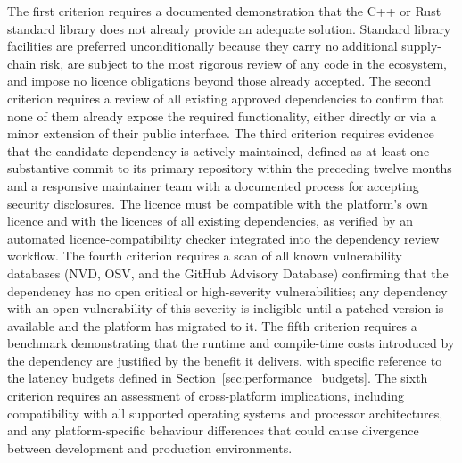 \documentclass[12pt,openany]{book}
\numberwithin{equation}{chapter}
\theoremstyle{plain}
\theoremstyle{definition}
\theoremstyle{remark}
\begin{document}
The first criterion requires a documented demonstration that the C++ or Rust standard library does not already provide an adequate solution. Standard library facilities are preferred unconditionally because they carry no additional supply-chain risk, are subject to the most rigorous review of any code in the ecosystem, and impose no licence obligations beyond those already accepted. The second criterion requires a review of all existing approved dependencies to confirm that none of them already expose the required functionality, either directly or via a minor extension of their public interface. The third criterion requires evidence that the candidate dependency is actively maintained, defined as at least one substantive commit to its primary repository within the preceding twelve months and a responsive maintainer team with a documented process for accepting security disclosures. The licence must be compatible with the platform's own licence and with the licences of all existing dependencies, as verified by an automated licence-compatibility checker integrated into the dependency review workflow. The fourth criterion requires a scan of all known vulnerability databases (NVD, OSV, and the GitHub Advisory Database) confirming that the dependency has no open critical or high-severity vulnerabilities; any dependency with an open vulnerability of this severity is ineligible until a patched version is available and the platform has migrated to it. The fifth criterion requires a benchmark demonstrating that the runtime and compile-time costs introduced by the dependency are justified by the benefit it delivers, with specific reference to the latency budgets defined in Section~\ref{sec:performance_budgets}. The sixth criterion requires an assessment of cross-platform implications, including compatibility with all supported operating systems and processor architectures, and any platform-specific behaviour differences that could cause divergence between development and production environments.
\end{document}
